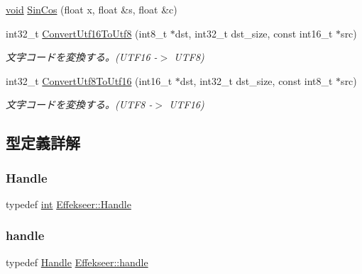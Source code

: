 \begin{DoxyCompactItemize}
\item 
\mbox{\hyperlink{namespace_effekseer_ab34c4088e512200cf4c2716f168deb56}{void}} \mbox{\hyperlink{namespace_effekseer_a4eab7724e1fc9c1cb66aac61b3d568d9}{Sin\+Cos}} (float x, float \&s, float \&c)
\item 
int32\+\_\+t \mbox{\hyperlink{namespace_effekseer_afcbbbacdf23834fd7e8619e3af4e837c}{Convert\+Utf16\+To\+Utf8}} (int8\+\_\+t $\ast$dst, int32\+\_\+t dst\+\_\+size, const int16\+\_\+t $\ast$src)
\begin{DoxyCompactList}\small\item\em 文字コードを変換する。(U\+T\+F16 -\/$>$ U\+T\+F8) \end{DoxyCompactList}\item 
int32\+\_\+t \mbox{\hyperlink{namespace_effekseer_abcfc5535cdc6dc92e50f8453cbb01214}{Convert\+Utf8\+To\+Utf16}} (int16\+\_\+t $\ast$dst, int32\+\_\+t dst\+\_\+size, const int8\+\_\+t $\ast$src)
\begin{DoxyCompactList}\small\item\em 文字コードを変換する。(U\+T\+F8 -\/$>$ U\+T\+F16) \end{DoxyCompactList}\end{DoxyCompactItemize}


\subsection{型定義詳解}
\mbox{\label{namespace_effekseer_afba58b8d812da862190e9bbfc040824a}} 
\subsubsection{\texorpdfstring{Handle}{Handle}}
{\footnotesize\ttfamily typedef \mbox{\hyperlink{namespace_effekseer_ace0abf7c2e6947e519ebe8b54cbcc30a}{int}} \mbox{\hyperlink{namespace_effekseer_afba58b8d812da862190e9bbfc040824a}{Effekseer\+::\+Handle}}}

\mbox{\label{namespace_effekseer_afd99b336b206999bdcca3e431648efbc}} 
\subsubsection{\texorpdfstring{handle}{handle}}
{\footnotesize\ttfamily typedef \mbox{\hyperlink{namespace_effekseer_afba58b8d812da862190e9bbfc040824a}{Handle}} \mbox{\hyperlink{namespace_effekseer_afd99b336b206999bdcca3e431648efbc}{Effekseer\+::handle}}}

